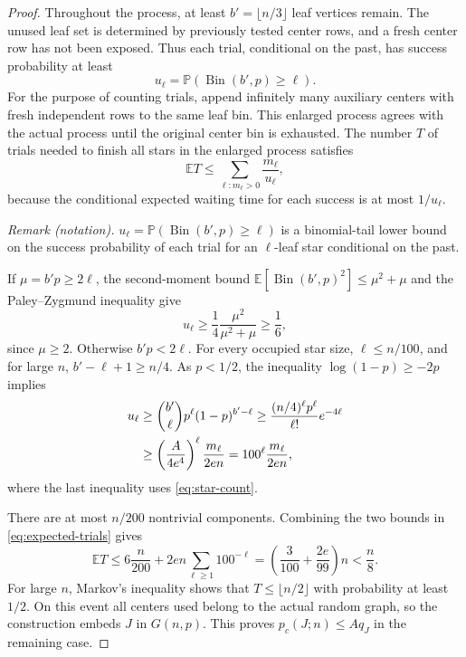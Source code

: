 \documentclass[11pt]{article}
\theoremstyle{remark}
\numberwithin{equation}{section}
\newcommand{\E}{\mathbb E}
\newcommand{\Prob}{\mathbb P}
\DeclareMathOperator{\Bin}{Bin}
\begin{document}
\begin{proof}
Throughout the process, at least $b'=\lfloor n/3\rfloor$
leaf vertices remain. The unused leaf set is determined by
previously tested center rows, and a fresh center row has not
been exposed. Thus each trial, conditional on the past, has
success probability at least
\begin{equation}\label{eq:star-success}
 u_\ell=\Prob(\Bin(b',p)\geq\ell).
\end{equation}
For the purpose of counting trials, append infinitely many
auxiliary centers with fresh independent rows to the same leaf
bin. This enlarged process agrees with the actual process until
the original center bin is exhausted. The number $T$ of trials
needed to finish all stars in the enlarged process satisfies
\begin{equation}\label{eq:expected-trials}
 \E T\leq\sum_{\ell:m_\ell>0}\frac{m_\ell}{u_\ell},
\end{equation}
because the conditional expected waiting time for each success
is at most $1/u_\ell$.

\noindent\textit{Remark (notation).} $u_\ell=\Prob(\Bin(b',p)\geq\ell)$ is a binomial-tail lower bound on the success probability of each trial for an $\ell$-leaf star conditional on the past.


If $\mu=b'p\geq2\ell$, the second-moment bound
$\E[\Bin(b',p)^2]\leq\mu^2+\mu$ and the Paley--Zygmund
inequality give
\[
 u_\ell\geq\frac14\frac{\mu^2}{\mu^2+\mu}\geq\frac16,
\]
since $\mu\geq2$. Otherwise $b'p<2\ell$. For every occupied
star size, $\ell\leq n/100$, and for large $n$,
$b'-\ell+1\geq n/4$. As $p<1/2$, the inequality
$\log(1-p)\geq-2p$ implies
\begin{align}
 u_\ell
 &\geq\binom{b'}{\ell}p^\ell(1-p)^{b'-\ell}
 \geq\frac{(n/4)^\ell p^\ell}{\ell!}e^{-4\ell}\notag\\
 &\geq\left(\frac{A}{4e^4}\right)^\ell
        \frac{m_\ell}{2e n}
 =100^\ell\frac{m_\ell}{2e n},
 \label{eq:star-small-mean}
\end{align}
where the last inequality uses \eqref{eq:star-count}.

There are at most $n/200$ nontrivial components. Combining
the two bounds in \eqref{eq:expected-trials} gives
\[
 \E T\leq6\frac{n}{200}+2e n\sum_{\ell\geq1}100^{-\ell}
 =\left(\frac3{100}+\frac{2e}{99}\right)n<\frac n8.
\]
For large $n$, Markov's inequality shows that
$T\leq\lfloor n/2\rfloor$ with probability at least $1/2$.
On this event all centers used belong to the actual random graph,
so the construction embeds $J$ in $G(n,p)$. This proves
$p_c(J;n)\leq Aq_J$ in the remaining case.
\end{proof}
\end{document}

